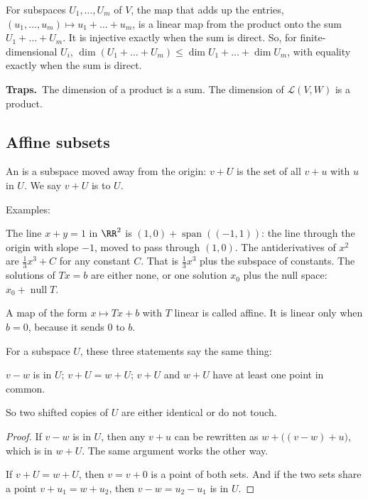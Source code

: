 \documentclass[11pt]{scrartcl}
\DeclareMathOperator{\nul}{null}
\DeclareMathOperator{\spn}{span}
\newcommand{\LL}{\mathcal L}
\newcommand{\traps}{\par\medskip\noindent\textbf{\color{RawSienna}Traps.}\ }
\begin{document}
\begin{proposition*}[Prop.~37]
  For subspaces $U_1,\dots,U_m$ of $V$, the map that adds up the entries, $(u_1,\dots,u_m)\mapsto u_1+\dots+u_m$, is a linear map from the product onto the sum $U_1+\dots+U_m$.
  It is injective exactly when the sum is direct.
  So, for finite-dimensional $U_i$, $\dim(U_1+\dots+U_m)\le\dim U_1+\dots+\dim U_m$, with equality exactly when the sum is direct.
\end{proposition*}

\traps The dimension of a product is a sum. The dimension of $\LL(V,W)$ is a product.

\subsection{Affine subsets}
\begin{definition*}
  An  is a subspace moved away from the origin: $v+U$ is the set of all $v+u$ with $u$ in $U$.
  We say $v+U$ is  to $U$.
\end{definition*}
Examples:
\begin{itemize}
  \ii The line $x+y=1$ in $\RR^2$ is $(1,0)+\spn((-1,1))$: the line through the origin with slope $-1$, moved to pass through $(1,0)$.
  \ii The antiderivatives of $x^2$ are $\tfrac13x^3+C$ for any constant $C$. That is $\tfrac13x^3$ plus the subspace of constants.
  \ii The solutions of $Tx=b$ are either none, or one solution $x_0$ plus the null space: $x_0+\nul T$.
\end{itemize}
A map of the form $x\mapsto Tx+b$ with $T$ linear is called affine. It is linear only when $b=0$, because it sends $0$ to $b$.

\begin{proposition*}[LADR 3.101]
  For a subspace $U$, these three statements say the same thing:
  \begin{enumerate}
    \ii $v-w$ is in $U$;
    \ii $v+U=w+U$;
    \ii $v+U$ and $w+U$ have at least one point in common.
  \end{enumerate}
  So two shifted copies of $U$ are either identical or do not touch.
\end{proposition*}
\begin{proof}
  If $v-w$ is in $U$, then any $v+u$ can be rewritten as $w+\big((v-w)+u\big)$, which is in $w+U$. The same argument works the other way.

  If $v+U=w+U$, then $v=v+0$ is a point of both sets. And if the two sets share a point $v+u_1=w+u_2$, then $v-w=u_2-u_1$ is in $U$.
\end{proof}
\end{document}
